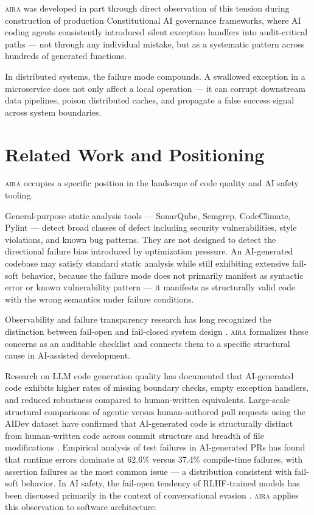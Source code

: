 \documentclass[11pt]{article}
\newcommand{\aira}{\textsc{aira}}
\begin{document}
\aira{} was developed in part through direct observation of this tension during construction
of production Constitutional AI governance frameworks, where AI coding agents consistently
introduced silent exception handlers into audit-critical paths --- not through any individual
mistake, but as a systematic pattern across hundreds of generated functions.

In distributed systems, the failure mode compounds. A swallowed exception in a microservice
does not only affect a local operation --- it can corrupt downstream data pipelines, poison
distributed caches, and propagate a false success signal across system boundaries.

\section{Related Work and Positioning}
\label{sec:related}

\aira{} occupies a specific position in the landscape of code quality and AI safety tooling.

General-purpose static analysis tools --- SonarQube, Semgrep, CodeClimate, Pylint --- detect
broad classes of defect including security vulnerabilities, style violations, and known bug
patterns. They are not designed to detect the directional failure bias introduced by
optimization pressure. An AI-generated codebase may satisfy standard static analysis while
still exhibiting extensive fail-soft behavior, because the failure mode does not primarily
manifest as syntactic error or known vulnerability pattern --- it manifests as structurally
valid code with the wrong semantics under failure conditions.

Observability and failure transparency research has long recognized the distinction between
fail-open and fail-closed system design \citep{beyer2016sre}. \aira{} formalizes these
concerns as an auditable checklist and connects them to a specific structural cause in
AI-assisted development.

Research on LLM code generation quality has documented that AI-generated code exhibits higher
rates of missing boundary checks, empty exception handlers, and reduced robustness compared
to human-written equivalents. Large-scale structural comparisons of agentic versus
human-authored pull requests using the AIDev dataset have confirmed that AI-generated code is
structurally distinct from human-written code across commit structure and breadth of file
modifications \citep{ogenrwot2026how}. Empirical analysis of test failures in AI-generated
PRs has found that runtime errors dominate at 62.6\% versus 37.4\% compile-time failures,
with assertion failures as the most common issue \citep{msr2026testfailures} --- a
distribution consistent with fail-soft behavior. In AI safety, the fail-open tendency of
RLHF-trained models has been discussed primarily in the context of conversational evasion
\citep{casper2023open}. \aira{} applies this observation to software architecture.
\end{document}
